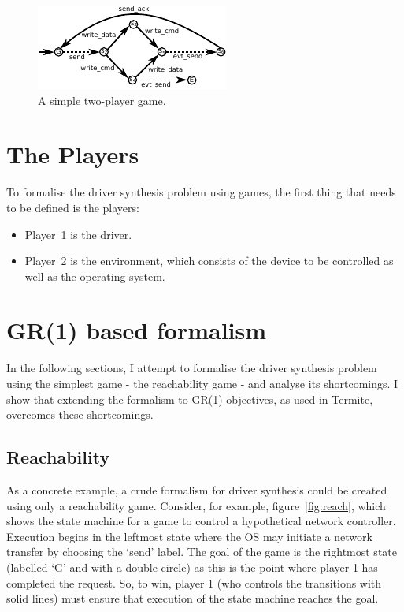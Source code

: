 \begin{figure}[t]
    \center
    \includegraphics[width=0.7\linewidth]{imgs/game.pdf}
    \caption{A simple two-player game.}
    \label{f:game}
\end{figure}

\section{The Players}

To formalise the driver synthesis problem using games, the first thing that needs to be defined is the players:

\begin{itemize}
    \item Player~1 is the driver. 
    \item Player~2 is the environment, which consists of the device to be controlled as well as the operating system.
\end{itemize}

\section{GR(1) based formalism}

In the following sections, I attempt to formalise the driver synthesis problem using the simplest game - the reachability game - and analyse its shortcomings. I show that extending the formalism to GR(1) objectives, as used in Termite, overcomes these shortcomings.

\subsection{Reachability}

As a concrete example, a crude formalism for driver synthesis could be created using only a reachability game. Consider, for example, figure~\ref{fig:reach}, which shows the state machine for a game to control a hypothetical network controller. Execution begins in the leftmost state where the OS may initiate a network transfer by choosing the `send' label. The goal of the game is the rightmost state (labelled `G' and with a double circle) as this is the point where player 1 has completed the request. So, to win, player 1 (who controls the transitions with solid lines) must ensure that execution of the state machine reaches the goal. 

